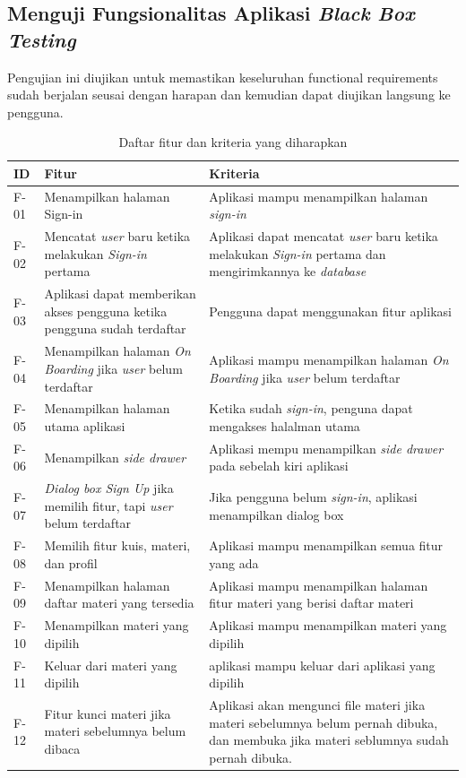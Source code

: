 \subsection{Menguji Fungsionalitas Aplikasi \textit{Black Box Testing}}
Pengujian ini diujikan untuk memastikan keseluruhan functional requirements sudah berjalan seusai dengan harapan dan kemudian dapat diujikan langsung ke pengguna.
\begin{table}[H]
	\centering
	\caption{Daftar fitur dan kriteria yang diharapkan}
	\begin{tabular}{|m{1cm}|p{}|p{}|}
		\hline
		\centering\textbf{ID} & \centering\textbf{Fitur} & \multicolumn{1}{m{0.45\textwidth}|}{\centering \textbf{Kriteria}} \\
		\hline
		F-01 &Menampilkan halaman Sign-in & Aplikasi mampu menampilkan halaman \textit{sign-in} \\
		\hline
		F-02 &Mencatat \textit{user} baru ketika melakukan \textit{Sign-in} pertama & Aplikasi dapat mencatat \textit{user} baru ketika melakukan \textit{Sign-in} pertama dan mengirimkannya ke \textit{database}\\
		\hline
		F-03 &Aplikasi dapat memberikan akses pengguna ketika pengguna sudah terdaftar& Pengguna dapat menggunakan fitur aplikasi\\
		\hline
		F-04 &Menampilkan halaman \textit{On Boarding} jika \textit{user} belum terdaftar & Aplikasi mampu menampilkan halaman \textit{On Boarding} jika \textit{user} belum terdaftar  \\
		\hline
		F-05&Menampilkan halaman utama aplikasi& Ketika sudah \textit{sign-in}, penguna dapat mengakses halalman utama \\
		\hline
		F-06&Menampilkan \textit{side drawer}& Aplikasi mempu menampilkan \textit{side drawer} pada sebelah kiri aplikasi\\
		\hline
		F-07&\textit{Dialog box Sign Up} jika memilih fitur, tapi \textit{user} belum terdaftar& Jika pengguna belum \textit{sign-in}, aplikasi menampilkan dialog box \\
		\hline
		F-08&Memilih fitur kuis, materi, dan profil& Aplikasi mampu menampilkan semua fitur yang ada\\
		\hline
		F-09 &Menampilkan halaman daftar materi yang tersedia& Aplikasi mampu menampilkan halaman fitur materi yang berisi daftar materi \\
		\hline
		F-10&Menampilkan materi yang dipilih & Aplikasi mampu menampilkan materi yang dipilih\\
		\hline
		F-11&Keluar dari materi yang dipilih& aplikasi mampu keluar dari aplikasi yang dipilih\\
		\hline
		F-12&Fitur kunci materi jika materi sebelumnya belum dibaca& Aplikasi akan mengunci file materi jika materi sebelumnya belum pernah dibuka, dan membuka jika materi seblumnya sudah pernah dibuka. \\
		\hline
	\end{tabular}
\end{table}
